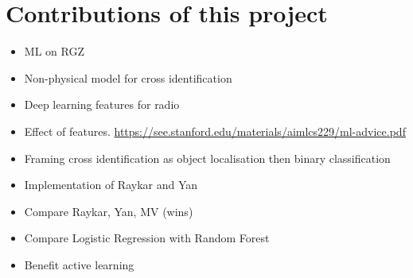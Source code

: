 \section{Contributions of this project}

\begin{itemize}
  \item ML on RGZ
  \item Non-physical model for cross identification
  \item Deep learning features for radio
  \item Effect of features. \url{https://see.stanford.edu/materials/aimlcs229/ml-advice.pdf}
  \item Framing cross identification as object localisation then binary classification
  \item Implementation of Raykar and Yan
  \item Compare Raykar, Yan, MV (wins)
  \item Compare Logistic Regression with Random Forest
  \item Benefit active learning
\end{itemize}
